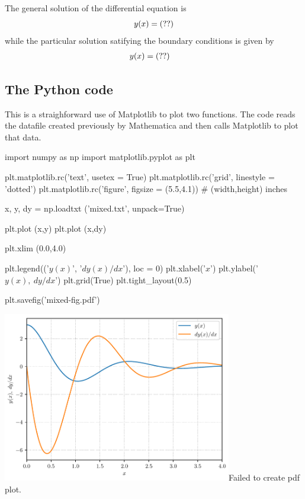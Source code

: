 \documentclass[12pt]{article}
\begin{document}
\vspace{10pt}

The general solution of the differential equation is
\begin{equation*}
  y(x) = \mma{ans.101}
\end{equation*}
while the particular solution satifying the boundary conditions is given by
\vspace{5pt}
\begin{align*}
    y(x) &= \mma{ans.102}
\end{align*}

\clearpage

\subsection*{The Python code}

This is a straighforward use of Matplotlib to plot two functions. The code reads the datafile created previously by Mathematica and then calls Matplotlib to plot that data.

\begin{python}
   import numpy as np
   import matplotlib.pyplot as plt

   plt.matplotlib.rc('text', usetex = True)
   plt.matplotlib.rc('grid', linestyle = 'dotted')
   plt.matplotlib.rc('figure', figsize = (5.5,4.1)) # (width,height) inches

   x, y, dy = np.loadtxt ('mixed.txt', unpack=True)

   plt.plot (x,y)
   plt.plot (x,dy)

   plt.xlim (0.0,4.0)

   plt.legend(('$y(x)$', '$dy(x)/dx$'), loc = 0)
   plt.xlabel('$x$')
   plt.ylabel('$y(x),\> dy/dx$')
   plt.grid(True)
   plt.tight_layout(0.5)

   plt.savefig('mixed-fig.pdf')
\end{python}

\vspace{10pt}

\begin{minipage}{\textwidth}
   \centering
   {\includegraphics[width=0.75\textwidth]{mixed-fig.pdf}}{Failed to create pdf plot.}
\end{minipage}
\end{document}
